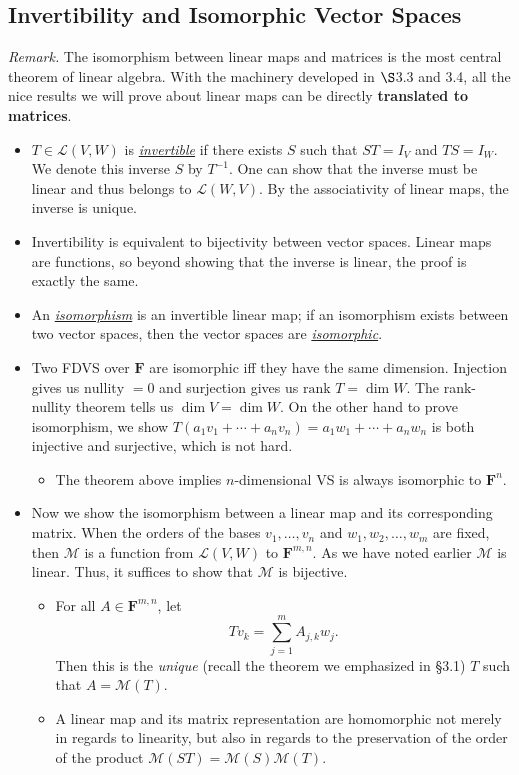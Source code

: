 \documentclass{article}
\newcommand{\df}[1]{\ul{\textit{#1}}}
\newcommand{\F}{\mathbf{F}}
\renewcommand{\d}{\dim}
\newcommand{\LVW}{\mathcal{L}(V,W)}
\newcommand{\M}{\mathcal{M}}
\newcommand{\bv}{v_1,\dots,v_n}
\begin{document}
\subsection{Invertibility and Isomorphic Vector Spaces}
\textit{Remark.} The isomorphism between linear maps and matrices is the most central theorem of linear algebra. With the machinery developed in $\S$3.3 and 3.4, all the nice results we will prove about linear maps can be directly \textbf{translated to matrices}.
\begin{itemize}
    \item $T \in \LVW$ is \df{invertible} if there exists $S$ such that $ST = I_V$ and $TS = I_W$. We denote this inverse $S$ by $T^{-1}$. One can show that the inverse must be linear and thus belongs to $\mathcal{L}(W,V)$. By the associativity of linear maps, the inverse is unique.
    \item Invertibility is equivalent to bijectivity between vector spaces. Linear maps are functions, so beyond showing that the inverse is linear, the proof is exactly the same.
    \item An \df{isomorphism} is an invertible linear map; if an isomorphism exists between two vector spaces, then the vector spaces are \df{isomorphic}.
    \item Two FDVS over $\F$ are isomorphic iff they have the same dimension. Injection gives us $\text{nullity } = 0$ and surjection gives us $\text{rank } T = \d W$. The rank-nullity theorem tells us $\d V = \d W$. On the other hand to prove isomorphism, we show $T(a_1v_1+\cdots+a_nv_n) = a_1w_1+\cdots+a_nw_n$ is both injective and surjective, which is not hard.
    \begin{itemize}
        \item The theorem above implies $n$-dimensional VS is always isomorphic to $\F^n$.
    \end{itemize}
    \item Now we show the isomorphism between a linear map and its corresponding matrix. When the orders of the bases $\bv$ and $w_1,w_2,\dots,w_m$ are fixed, then $\M$ is a function from $\LVW$ to $\F^{m,n}$. As we have noted earlier $\M$ is linear. Thus, it suffices to show that $\M$ is bijective.
    \begin{itemize}
        \item For all $A \in \F^{m,n}$, let $$Tv_k = \sum_{j = 1}^m A_{j,k}w_j.$$ Then this is the \emph{unique} (recall the theorem we emphasized in \S3.1) $T$ such that $A = \M(T)$.
        \item A linear map and its matrix representation are homomorphic not merely in regards to linearity, but also in regards to the preservation of the order of the product $\M(ST) = \M(S)\M(T)$.

\end{itemize}
\end{itemize}
\end{document}
